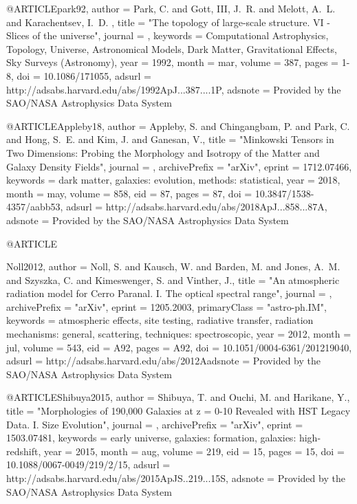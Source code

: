 \documentclass{aa}
\begin{document}
{@ARTICLE{park92,
   author = {{Park}, C. and {Gott}, III, J.~R. and {Melott}, A.~L. and {Karachentsev}, I.~D.
	},
    title = "{The topology of large-scale structure. VI - Slices of the universe}",
  journal = {\apj},
 keywords = {Computational Astrophysics, Topology, Universe, Astronomical Models, Dark Matter, Gravitational Effects, Sky Surveys (Astronomy)},
     year = 1992,
    month = mar,
   volume = 387,
    pages = {1-8},
      doi = {10.1086/171055},
   adsurl = {http://adsabs.harvard.edu/abs/1992ApJ...387....1P},
  adsnote = {Provided by the SAO/NASA Astrophysics Data System}
}



@ARTICLE{Appleby18,
   author = {{Appleby}, S. and {Chingangbam}, P. and {Park}, C. and {Hong}, S.~E. and 
	{Kim}, J. and {Ganesan}, V.},
    title = "{Minkowski Tensors in Two Dimensions: Probing the Morphology and Isotropy of the Matter and Galaxy Density Fields}",
  journal = {\apj},
archivePrefix = "arXiv",
   eprint = {1712.07466},
 keywords = {dark matter, galaxies: evolution, methods: statistical},
     year = 2018,
    month = may,
   volume = 858,
      eid = {87},
    pages = {87},
      doi = {10.3847/1538-4357/aabb53},
   adsurl = {http://adsabs.harvard.edu/abs/2018ApJ...858...87A},
  adsnote = {Provided by the SAO/NASA Astrophysics Data System}
}



@ARTICLE{Noll2012,
   author = {{Noll}, S. and {Kausch}, W. and {Barden}, M. and {Jones}, A.~M. and 
	{Szyszka}, C. and {Kimeswenger}, S. and {Vinther}, J.},
    title = "{An atmospheric radiation model for Cerro Paranal. I. The optical spectral range}",
  journal = {\aap},
archivePrefix = "arXiv",
   eprint = {1205.2003},
 primaryClass = "astro-ph.IM",
 keywords = {atmospheric effects, site testing, radiative transfer, radiation mechanisms: general, scattering, techniques: spectroscopic},
     year = 2012,
    month = jul,
   volume = 543,
      eid = {A92},
    pages = {A92},
      doi = {10.1051/0004-6361/201219040},
   adsurl = {http://adsabs.harvard.edu/abs/2012Aadsnote = {Provided by the SAO/NASA Astrophysics Data System}
}

@ARTICLE{Shibuya2015,
   author = {{Shibuya}, T. and {Ouchi}, M. and {Harikane}, Y.},
    title = "{Morphologies of {\tilde}190,000 Galaxies at z = 0-10 Revealed with HST Legacy Data. I. Size Evolution}",
  journal = {\apjs},
archivePrefix = "arXiv",
   eprint = {1503.07481},
 keywords = {early universe, galaxies: formation, galaxies: high-redshift},
     year = 2015,
    month = aug,
   volume = 219,
      eid = {15},
    pages = {15},
      doi = {10.1088/0067-0049/219/2/15},
   adsurl = {http://adsabs.harvard.edu/abs/2015ApJS..219...15S},
  adsnote = {Provided by the SAO/NASA Astrophysics Data System}
}

}}
\end{document}
